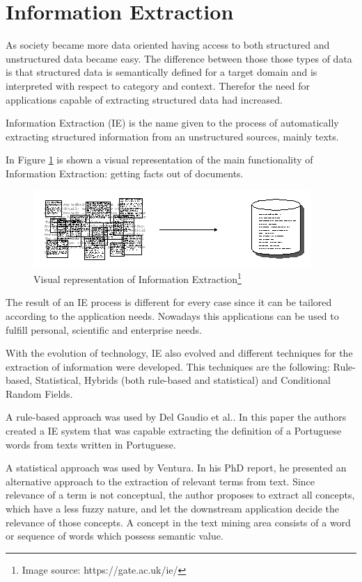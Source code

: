 \section{Information Extraction}

As society became more data oriented having access to both structured and unstructured data became easy.
The difference between those those types of data is that structured data is semantically defined for a target domain and is interpreted with respect to category and context.
Therefor the need for applications capable of extracting structured data had increased.

Information Extraction (IE) is the name given to the process of automatically extracting structured information from an unstructured sources, mainly texts.

In Figure \ref{fig:iext} is shown a visual representation of the main functionality of Information Extraction: getting facts out of documents.
\begin{figure}[H]
\centering
\includegraphics[scale=0.65]{ch2/assets/extract.png}
    \caption[InformationExtraction]{Visual representation of Information Extraction\footnote{Image source: https://gate.ac.uk/ie/}}
\label{fig:iext}
\end{figure}

The result of an IE process is different for every case since it can be tailored according to the application needs.
Nowadays this applications can be used to fulfill personal, scientific and enterprise needs.

With the evolution of technology, IE also evolved and different techniques for the extraction of information were developed.
This techniques are the following: Rule-based, Statistical, Hybrids (both rule-based and statistical) and Conditional Random Fields\cite{sarawagi2008information}.

A rule-based approach was used by Del Gaudio et al.\cite{del2007automatic}.
In this paper the authors created a IE system that was capable extracting the definition of a Portuguese words from texts written in Portuguese.

A statistical approach was used by Ventura\cite{ventura2014automatic}.
In his PhD report, he presented an alternative approach to the extraction of relevant terms from text.
Since relevance of a term is not conceptual, the author proposes to extract all concepts, which have a less fuzzy nature, and let the downstream application decide the relevance of those concepts.
A concept in the text mining area consists of a word or sequence of words which possess semantic value.

